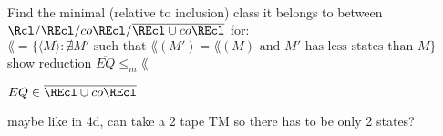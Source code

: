  \\

Find the minimal (relative to inclusion) class it belongs to between $\Rcl/\REcl/co\REcl/\overline{\REcl \cup co\REcl}$ for: \\
$\lang = \{\langle M \rangle : \nexists M' \text{ such that } \lang(M')=\lang(M) \text{ and } M' \text{ has less states than } M\}$  \\

show reduction $\overline{EQ} \leq_m \lang$

$EQ \in \overline{\REcl \cup co\REcl}$

maybe like in 4d, can take a 2 tape TM so there has to be only 2 states?